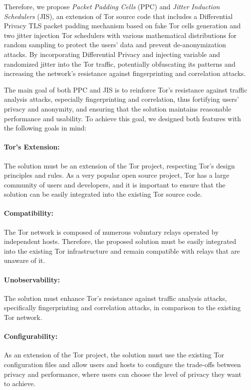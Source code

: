 Therefore, we propose \textit{Packet Padding Cells} (PPC) and \textit{Jitter Induction Schedulers} (JIS), an extension of Tor source code that includes a Differential Privacy TLS packet padding mechanism based on fake Tor cells generation and two jitter injection Tor schedulers with various mathematical distributions for random sampling to protect the users' data and prevent de-anonymization attacks. By incorporating Differential Privacy and injecting variable and randomized jitter into the Tor traffic, potentially obfuscating its patterns and increasing the network's resistance against fingerprinting and correlation attacks.

The main goal of both PPC and JIS is to reinforce Tor's resistance against traffic analysis attacks, especially fingerprinting and correlation, thus fortifying users' privacy and anonymity, and ensuring that the solution maintains reasonable performance and usability. To achieve this goal, we designed both features with the following goals in mind:
\paragraph{Tor's Extension:} The solution must be an extension of the Tor project, respecting Tor's design principles and rules. As a very popular open source project, Tor has a large community of users and developers, and it is important to ensure that the solution can be easily integrated into the existing Tor source code.
\paragraph{Compatibility:} The Tor network is composed of numerous voluntary relays operated by independent hosts. Therefore, the proposed solution must be easily integrated into the existing Tor infrastructure and remain compatible with relays that are unaware of it.
\paragraph{Unobservability:} The solution must enhance Tor's resistance against traffic analysis attacks, specifically fingerprinting and correlation attacks, in comparison to the existing Tor network. 
\paragraph{Configurability:} As an extension of the Tor project, the solution must use the existing Tor configuration files and allow users and hosts to configure the trade-offs between privacy and performance, where users can choose the level of privacy they want to achieve.
